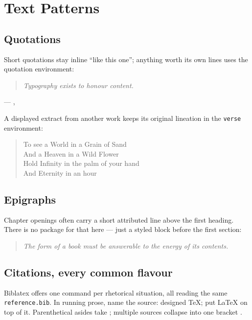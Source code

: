 %
\chapter{Text Patterns}\label{ch:patterns}

\section{Quotations}
Short quotations stay inline \enquote{like this one}; anything worth
its own lines uses the quotation environment:

\begin{quotation}
\noindent\itshape
Typography exists to honour content.
\end{quotation}
\begin{flushright}
--- \citeauthor{bringhurst2004}, \citeyear{bringhurst2004}
\end{flushright}

A displayed extract from another work keeps its original lineation
in the \texttt{verse} environment:

\begin{verse}
To see a World in a Grain of Sand\\
And a Heaven in a Wild Flower\\
\hspace*{2em}Hold Infinity in the palm of your hand\\
\hspace*{2em}And Eternity in an hour
\end{verse}

\section{Epigraphs}
Chapter openings often carry a short attributed line above the
first heading. There is no package for that here --- just a styled
block before the first section:

\begin{quote}
\small\itshape\color{AccentColor}
The form of a book must be answerable to the energy of its contents.
\end{quote}

\section{Citations, every common flavour}\label{sec:cites}
Biblatex offers one command per rhetorical situation, all reading
the same \texttt{reference.bib}. In running prose, name the source:
\textcite{knuth1984} designed TeX;
\textcite{lamport1994} put LaTeX on top of it. Parenthetical
asides take \parencite{mittal2005}; multiple sources collapse into
one bracket \parencite{knuth1984,lamport1994,mittal2005}.

